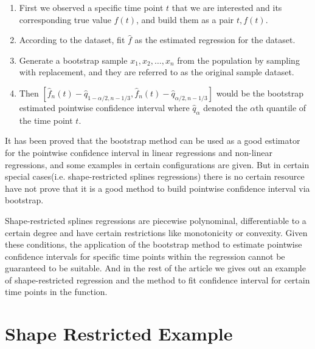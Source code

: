 \documentclass[12pt]{article}
\begin{document}
\begin{enumerate}[label=\arabic*.]
    \item First we observed a specific time point \(t\) that we are interested and its corresponding true value \(f(t)\), and build them as a pair \(t, f(t)\).
    \item According to the dataset, fit \(\hat{f}\) as the estimated regression for the dataset.
    \item Generate a bootstrap sample \(x_1, x_2, \ldots, x_n\) from the population by sampling with replacement, and they are referred to as the original sample dataset. 
    \item Then  \( [\hat{f}_n(t) - \hat{q}_{1-\alpha/2,n-1/3}, \hat{f}_n(t) - \hat{q}_{\alpha/2,n-1/3} ]\)  would be the bootstrap estimated pointwise confidence interval where \(\hat{q}_\alpha\) denoted the \(\alpha\)th quantile of the time point \(t\).

\end{enumerate}





It has been proved that the bootstrap method can be used as a good estimator for the pointwise confidence interval in linear regressions and non-linear regressions\cite{efron1979bootstrap}\cite{davidson1999bootstrap}, and some examples in certain configurations are given.\cite{ruhe2019bootstrap}\cite{ma2019inference}\cite{dugas2010pointwise} But in certain special cases(i.e. shape-restricted splines regressions) there is no certain resource have not prove that it is a good method to build pointwise confidence interval via bootstrap.

Shape-restricted splines regressions are piecewise polynominal, differentiable to a certain degree and have certain restrictions like monotonicity or convexity.\cite{meyer2008inference} Given these conditions, the application of the bootstrap method to estimate pointwise confidence intervals for specific time points within the regression cannot be guaranteed to be suitable. And in the rest of the article we gives out an example of shape-restricted regression and the method to fit confidence interval for certain time points in the function.









\section{Shape Restricted Example}
\label{Shape Restricted Example}
\end{document}

